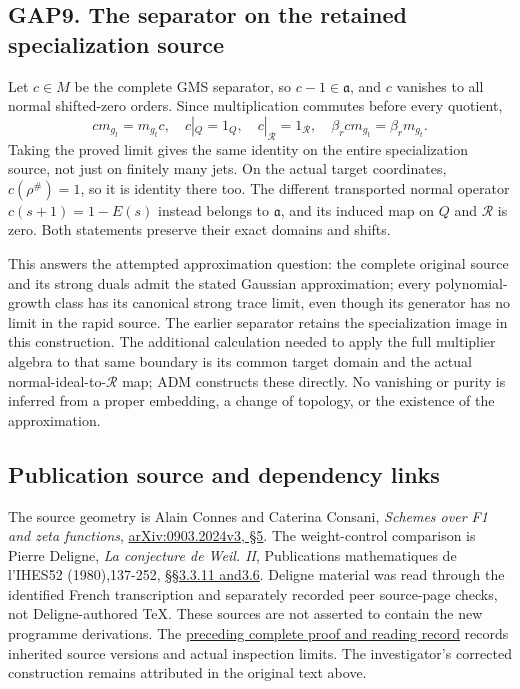 \subsection{GAP9. The separator on the retained specialization
source}\label{gap9.-the-separator-on-the-retained-specialization-source}

Let \(c\in M\) be the complete GMS separator, so \(c-1\in\mathfrak a\),
and \(c\) vanishes to all normal shifted-zero orders. Since
multiplication commutes before every quotient, \[
cm_{g_t}=m_{g_t}c,\quad c|_Q=1_Q,\quad c|_{\mathcal R}=1_{\mathcal R},
\quad\beta_rcm_{g_t}=\beta_rm_{g_t}.
\tag{GAP9.1}
\] Taking the proved limit gives the same identity on the entire
specialization source, not just on finitely many jets. On the actual
target coordinates, \(c(\rho^\#)=1\), so it is identity there too. The
different transported normal operator \(c(s+1)=1-E(s)\) instead belongs
to \(\mathfrak a\), and its induced map on \(Q\) and \(\mathcal R\) is
zero. Both statements preserve their exact domains and shifts.

This answers the attempted approximation question: the complete original
source and its strong duals admit the stated Gaussian approximation;
every polynomial-growth class has its canonical strong trace limit, even
though its generator has no limit in the rapid source. The earlier
separator retains the specialization image in this construction. The
additional calculation needed to apply the full multiplier algebra to
that same boundary is its common target domain and the actual
normal-ideal-to-\(\mathcal R\) map; ADM constructs these directly. No
vanishing or purity is inferred from a proper embedding, a change of
topology, or the existence of the approximation.

\subsection{Publication source and dependency
links}\label{publication-source-and-dependency-links}

The source geometry is Alain Connes and Caterina Consani, \emph{Schemes
over F1 and zeta functions},
\href{https://arxiv.org/abs/0903.2024v3}{arXiv:0903.2024v3, §5}. The
weight-control comparison is Pierre Deligne, \emph{La conjecture de
Weil. II}, Publications mathematiques de l'IHES52 (1980),137-252,
\href{https://www.numdam.org/item/PMIHES_1980__52__137_0/}{§§3.3.11
and3.6}. Deligne material was read through the identified French
transcription and separately recorded peer source-page checks, not
Deligne-authored TeX. These sources are not asserted to contain the new
programme derivations. The
\href{https://github.com/KokunoYumeto/zeta-function-research-reader/blob/36a82ecca98addb8a98b48204e349737856c7223/workbenches/splitzero-tandem/continuations/20260924-cohomology-weight-and-character-lifts/BUILD_AND_REVIEW.md}{preceding
complete proof and reading record} records inherited source versions and
actual inspection limits. The investigator's corrected construction
remains attributed in the original text above.
